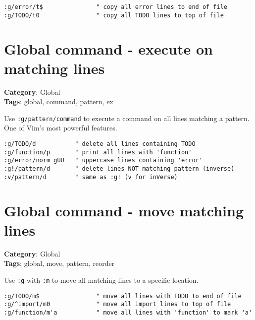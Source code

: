 {{{{{{\begin{Exa*}{}
\begin{Verbatim}[fontsize=\footnotesize, breaklines, breakanywhere]
:g/error/t$               " copy all error lines to end of file
:g/TODO/t0                " copy all TODO lines to top of file
\end{Verbatim}
\end{Exa*}

\section{Global command - execute on matching lines}

\textbf{Category}: Global\\ \textbf{Tags}: global, command, pattern, ex
\vspace{0.5cm}

Use {\footnotesize \Verb§:g/pattern/command§} to execute a command on all lines matching a pattern. One of Vim's most powerful features.

\begin{Exa*}{}
\begin{Verbatim}[fontsize=\footnotesize, breaklines, breakanywhere]
:g/TODO/d           " delete all lines containing TODO
:g/function/p       " print all lines with 'function'
:g/error/norm gUU   " uppercase lines containing 'error'
:g!/pattern/d       " delete lines NOT matching pattern (inverse)
:v/pattern/d        " same as :g! (v for inVerse)
\end{Verbatim}
\end{Exa*}

\section{Global command - move matching lines}

\textbf{Category}: Global\\ \textbf{Tags}: global, move, pattern, reorder
\vspace{0.5cm}

Use {\footnotesize \Verb§:g§} with {\footnotesize \Verb§:m§} to move all matching lines to a specific location.

\begin{Exa*}{}
\begin{Verbatim}[fontsize=\footnotesize, breaklines, breakanywhere]
:g/TODO/m$                " move all lines with TODO to end of file
:g/^import/m0             " move all import lines to top of file
:g/function/m'a           " move all lines with 'function' to mark 'a'
\end{Verbatim}
\end{Exa*}

}}}}}}

